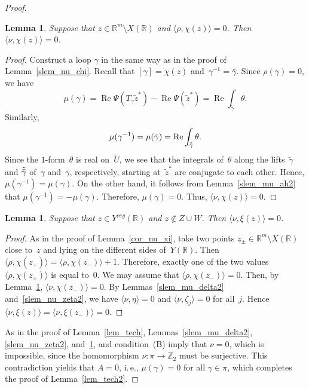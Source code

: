 \documentclass[reqno,tbtags,12pt]{amsart}
\numberwithin{equation}{section}
\newcommand{\R}{\mathbb{R}}
\newcommand{\Z}{\mathbb{Z}}
\newcommand{\tU}{\widetilde{U}}
\newcommand{\tz}{\tilde{z}}
\renewcommand{\Re}{\mathop{\mathrm{Re}}\nolimits}
\newtheorem{lem}[theorem]{Lemma}
\theoremstyle{definition}
\begin{document}
\begin{proof}
\begin{lem}\label{slem_nu_chi2}
Suppose that $z\in\R^m\setminus X(\R)$ and $\langle\rho,\chi(z)\rangle=0$. Then $\langle\nu,\chi(z)\rangle=0$.
\end{lem}


\begin{proof}
Construct a loop $\gamma$ in the same way as in the proof of Lemma~\ref{slem_nu_chi}. Recall that $[\gamma]=\chi(z)$ and~$\gamma^{-1}=\bar\gamma$. Since $\rho(\gamma)=0$, we have
$$
\mu(\gamma)=\Re\Psi(T_{\gamma}\tz^*)-\Re\Psi(\tz^*)=\Re\int_{\tilde\gamma}\theta.
$$
Similarly,
$$
\mu(\gamma^{-1})=\mu(\bar\gamma)=\Re\int_{\Tilde{\bar\gamma}}\theta.
$$
 Since the $1$-form~$\theta$ is real on~$\tU$, we see that the integrals of~$\theta$ along the lifts~$\tilde\gamma$ and $\Tilde{\bar\gamma}$ of~$\gamma$ and~$\bar\gamma$, respectively, starting at~$\tz^*$ are conjugate to each other. Hence,  $\mu(\gamma^{-1})=\mu(\gamma)$. On the other hand, it follows from Lemma~\ref{slem_mu_ah2} that $\mu(\gamma^{-1})=-\mu(\gamma)$. Therefore, $\mu(\gamma)=0$. Thus, $\langle\nu,\chi(z)\rangle=0$.
\end{proof}

\begin{lem}\label{cor_nu_xi2}
Suppose that $z\in Y^{reg}(\R)$ and $z\notin Z\cup W$. Then $\langle\nu,\xi(z)\rangle=0$.
\end{lem}


\begin{proof}
As in the proof of Lemma~\ref{cor_nu_xi}, take two points $z_{\pm}\in \R^m\setminus X(\R)$ close to~$z$ and lying on the different sides of~$Y(\R)$. Then  $\langle\rho,\chi(z_+)\rangle=\langle\rho,\chi(z_-)\rangle+1$. Therefore, exactly one of the two values $\langle\rho,\chi(z_{\pm})\rangle$ is equal to~$0$. We may assume that $\langle\rho,\chi(z_{-})\rangle=0$. Then, by Lemma~\ref{slem_nu_chi2}, $\langle\nu,\chi(z_{-})\rangle=0$. By Lemmas~\ref{slem_mu_delta2} and~\ref{slem_nu_zeta2}, we have $\langle\nu,\eta\rangle=0$ and $\langle\nu,\zeta_j\rangle=0$ for all~$j$. Hence $\langle\nu,\xi(z)\rangle=\langle\nu,\xi(z_-)\rangle=0$.
\end{proof}



As in the proof of Lemma~\ref{lem_tech}, Lemmas~\ref{slem_mu_delta2}, \ref{slem_nu_zeta2}, and~\ref{cor_nu_xi2}, and condition~(B) imply that $\nu=0$, which is impossible, since the homomorphism $\nu\colon\pi\to\Z_2$ must be surjective. This contradiction yields that  $A=0$, i.\,e., $\mu(\gamma)=0$ for all $\gamma\in\pi$, which completes the proof of Lemma~\ref{lem_tech2}.  
\end{proof}
\end{document}
